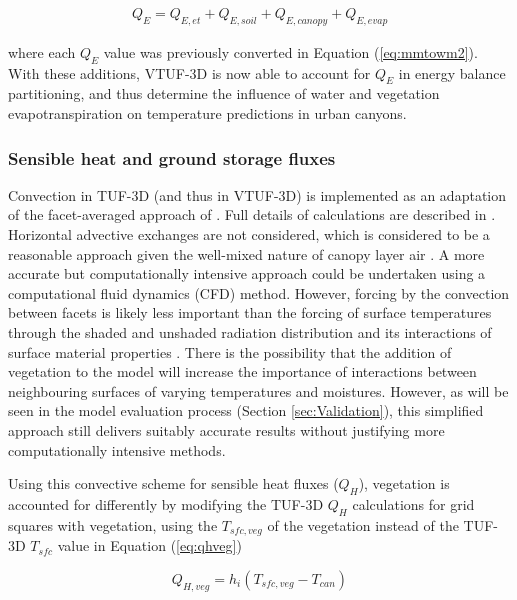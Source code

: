 \documentclass[final,3p,times,authoryear]{elsarticle}
\begin{document}
\begin{equation}\label{eq:lefromet} 
\begin{aligned}
Q_{E} = Q_{E,et} + Q_{E,soil} + Q_{E,canopy} + Q_{E,evap} 
\end{aligned}
\end{equation}

where each $Q_{E}$ value was previously converted in Equation (\ref{eq:mmtowm2}). With these additions, VTUF-3D is now able to account for $Q_{E}$ in energy balance partitioning, and thus determine the influence of water and vegetation evapotranspiration on temperature predictions in urban canyons.


\subsubsection{Sensible heat and ground storage fluxes}\label{sec:convection} 
Convection in TUF-3D (and thus in VTUF-3D) is implemented as an adaptation of the facet-averaged approach of \cite{Masson2000}. Full details of calculations are described in \cite{Krayenhoff2007}. Horizontal advective exchanges are not considered, which is considered to be a reasonable approach given the well-mixed nature of canopy layer air \citep{Krayenhoff2007}. A more accurate but computationally intensive approach could be undertaken using a computational fluid dynamics (CFD) method. However, forcing by the convection between facets is likely less important than the forcing of surface temperatures through the shaded and unshaded radiation distribution and its interactions of surface material properties \citep{Krayenhoff2007}. There is the possibility that the addition of vegetation to the model will increase the importance of interactions between neighbouring surfaces of varying temperatures and moistures. However, as will be seen in the model evaluation process (Section \ref{sec:Validation}), this simplified approach still delivers suitably accurate results without justifying more computationally intensive methods. 

Using this convective scheme for sensible heat fluxes ($Q_{H}$), vegetation is accounted for differently by modifying the TUF-3D $Q_{H}$ calculations for grid squares with vegetation, using the $T_{sfc,veg}$ of the vegetation instead of the TUF-3D $T_{sfc}$ value in Equation (\ref{eq:qhveg})

\begin{equation}\label{eq:qhveg}
 Q_{H,veg} = h_{i}  (T_{sfc,veg}-T_{can}) 
\end{equation}
\end{document}
